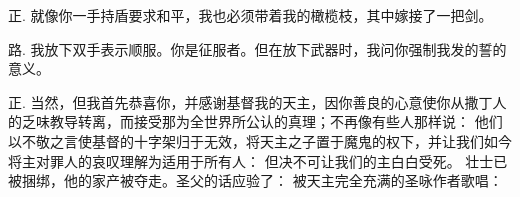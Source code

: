 正. 就像你一手持盾要求和平，我也必须带着我的橄榄枝，其中嫁接了一把剑。\par

路. 我放下双手表示顺服。你是征服者。但在放下武器时，我问你强制我发的誓的意义。\par

正. 当然，但我首先恭喜你，并感谢基督我的天主，因你善良的心意使你从撒丁人的乏味教导转离，而接受那为全世界所公认的真理；不再像有些人那样说： 他们以不敬之言使基督的十字架归于无效，将天主之子置于魔鬼的权下，并让我们如今将主对罪人的哀叹理解为适用于所有人： 但决不可让我们的主白白受死。 壮士已被捆绑，他的家产被夺走。圣父的话应验了：   被天主完全充满的圣咏作者歌唱：\par

